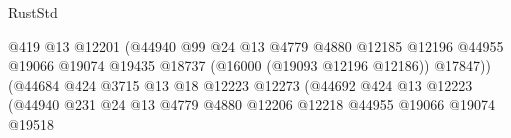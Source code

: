 \begin{lexlean}{RustStd}
\begin{coremodule}
                                                        @419
                                                        @13
                                                        @12201
                                                        (@44940
                                                          @99
                                                          @24
                                                          @13
                                                          @4779
                                                          @4880
                                                          @12185
                                                          @12196
                                                          @44955
                                                          @19066
                                                          @19074
                                                          @19435
                                                          @18737
                                                          (@16000 (@19093 @12196 @12186))
                                                          @17847))
                                                      (@44684
                                                        @424
                                                        @3715
                                                        @13
                                                        @18
                                                        @12223
                                                        @12273
                                                        (@44692
                                                          @424
                                                          @13
                                                          @12223
                                                          (@44940
                                                            @231
                                                            @24
                                                            @13
                                                            @4779
                                                            @4880
                                                            @12206
                                                            @12218
                                                            @44955
                                                            @19066
                                                            @19074
                                                            @19518

\end{coremodule}
\end{lexlean}
